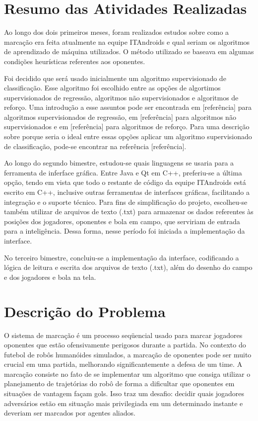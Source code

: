 \documentclass[a4paper,12pt]{article}
\begin{document}
\section{Resumo das Atividades Realizadas}
\label{secao:atividades_realizadas}

Ao longo dos dois primeiros meses, foram realizados estudos sobre como a marcação era feita atualmente na equipe ITAndroids e qual seriam os algoritmos de aprendizado de máquina utilizados. O método utilizado se baseava em algumas condições heurísticas referentes aos oponentes.

Foi decidido que será usado inicialmente um algoritmo supervisionado de classificação. Esse algoritmo foi escolhido entre as opções de algortimos supervisionados de regressão, algoritmos não supervisionados e algoritmos de reforço. Uma introdução a esse assuntos pode ser encontrada em [referência] para algoritmos supervisionados de regressão, em [referência] para algoritmos não supervisionados e em [referência] para algoritmos de reforço. Para uma descrição sobre porque seria o ideal entre essas opções aplicar um algoritmo supervisionado de classificação, pode-se encontrar na referência [referência].

Ao longo do segundo bimestre, estudou-se quais linguagens se usaria para a ferramenta de inferface gráfica. Entre Java e Qt em C++, preferiu-se a última opção, tendo em vista que todo o restante de código da equipe ITAndroids está escrito em C++, inclusive outras ferramentas de interfaces gráficas, facilitando a integração e o suporte técnico. Para fins de simplificação do projeto, escolheu-se também utilizar de arquivos de texto (.txt) para armazenar os dados referentes às posições dos jogadores, oponentes e bola em campo, que serviriam de entrada para a inteligência. Dessa forma, nesse período foi iniciada a implementação da interface.

No terceiro bimestre, concluiu-se a implementação da interface, codificando a lógica de leitura e escrita dos arquivos de texto (.txt), além do desenho do campo e dos jogadores e bola na tela.

\section{Descrição do Problema}
\label{secao:enunciado_problema}

O sistema de marcação é um processo seqüencial usado para marcar jogadores oponentes que estão ofensivamente perigosos durante a partida. No contexto do futebol de robôs humanóides simulados, a marcação de oponentes pode ser muito crucial em uma partida, melhorando significantemente a defesa de um time. A marcação consiste no fato de se implementar um algoritmo que consiga utilizar o planejamento de trajetórias do robô de forma a dificultar que oponentes em situações de vantagem façam gols. Isso traz um desafio: decidir quais jogadores adversários estão em situação mais privilegiada em um determinado instante e deveriam ser marcados por agentes aliados. 
\end{document}
